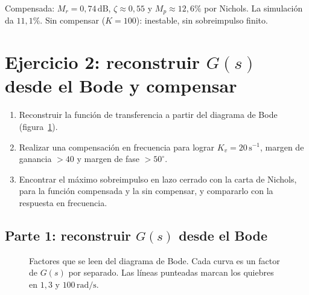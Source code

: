 \documentclass[11pt,a4paper]{article}
\newcommand{\rads}{\,\mathrm{rad/s}}
\newcommand{\dB}{\,\mathrm{dB}}
\begin{document}
\begin{resultado}
Compensada: $M_r=0{,}74\dB$, $\zeta\approx0{,}55$ y $M_p\approx12{,}6\%$ por Nichols. La simulación da $11{,}1\%$.
Sin compensar ($K=100$): inestable, sin sobreimpulso finito.
\end{resultado}

\section{Ejercicio 2: reconstruir $G(s)$ desde el Bode y compensar}
\begin{enunciado}
\begin{enumerate}[label=\arabic*)]
\item Reconstruir la función de transferencia a partir del diagrama de Bode (figura~\ref{fig:p2fac}).
\item Realizar una compensación en frecuencia para lograr $K_v=20\,\mathrm{s^{-1}}$, margen de ganancia $>40$ y margen de fase $>50^\circ$.
\item Encontrar el máximo sobreimpulso en lazo cerrado con la carta de Nichols, para la función compensada y la sin compensar, y compararlo con la respuesta en frecuencia.
\end{enumerate}
\end{enunciado}

\subsection{Parte 1: reconstruir $G(s)$ desde el Bode}

\begin{figure}[ht]
\centering
{}
\caption{Factores que se leen del diagrama de Bode. Cada curva es un factor de $G(s)$ por separado. Las líneas punteadas marcan los quiebres en $1{,}3$ y $100\rads$.}
\label{fig:p2fac}
\end{figure}
\end{document}

